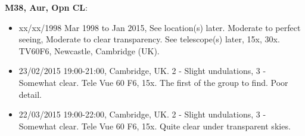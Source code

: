 {\bf M38, Aur, Opn CL}:
\begin{itemize}
\item xx/xx/1998 Mar 1998 to Jan 2015, See location(s) later. Moderate to perfect seeing, Moderate to clear transparency. See telescope(s) later, 15x, 30x. TV60F6, Newcastle, Cambridge (UK).
\item 23/02/2015 19:00-21:00, Cambridge, UK. 2 - Slight undulations, 3 - Somewhat clear. Tele Vue 60 F6, 15x. The first of the group to find. Poor detail.
\item 22/03/2015 19:00-22:00, Cambridge, UK. 2 - Slight undulations, 3 - Somewhat clear. Tele Vue 60 F6, 15x. Quite clear under transparent skies.
\end{itemize}
